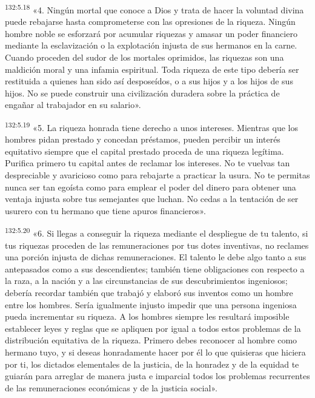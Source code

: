 \par
\textsuperscript{132:5.18} «4. Ningún mortal que conoce a Dios y trata de hacer la voluntad divina puede rebajarse hasta comprometerse con las opresiones de la riqueza. Ningún hombre noble se esforzará por acumular riquezas y amasar un poder financiero mediante la esclavización o la explotación injusta de sus hermanos en la carne. Cuando proceden del sudor de los mortales oprimidos, las riquezas son una maldición moral y una infamia espiritual. Toda riqueza de este tipo debería ser restituida a quienes han sido así desposeídos, o a sus hijos y a los hijos de sus hijos. No se puede construir una civilización duradera sobre la práctica de engañar al trabajador en su salario».

\par
\textsuperscript{132:5.19} «5. La riqueza honrada tiene derecho a unos intereses. Mientras que los hombres pidan prestado y concedan préstamos, pueden percibir un interés equitativo siempre que el capital prestado proceda de una riqueza legítima. Purifica primero tu capital antes de reclamar los intereses. No te vuelvas tan despreciable y avaricioso como para rebajarte a practicar la usura. No te permitas nunca ser tan egoísta como para emplear el poder del dinero para obtener una ventaja injusta sobre tus semejantes que luchan. No cedas a la tentación de ser usurero con tu hermano que tiene apuros financieros».

\par
\textsuperscript{132:5.20} «6. Si llegas a conseguir la riqueza mediante el despliegue de tu talento, si tus riquezas proceden de las remuneraciones por tus dotes inventivas, no reclames una porción injusta de dichas remuneraciones. El talento le debe algo tanto a sus antepasados como a sus descendientes; también tiene obligaciones con respecto a la raza, a la nación y a las circunstancias de sus descubrimientos ingeniosos; debería recordar también que trabajó y elaboró sus inventos como un hombre entre los hombres. Sería igualmente injusto impedir que una persona ingeniosa pueda incrementar su riqueza. A los hombres siempre les resultará imposible establecer leyes y reglas que se apliquen por igual a todos estos problemas de la distribución equitativa de la riqueza. Primero debes reconocer al hombre como hermano tuyo, y si deseas honradamente hacer por él lo que quisieras que hiciera por ti, los dictados elementales de la justicia, de la honradez y de la equidad te guiarán para arreglar de manera justa e imparcial todos los problemas recurrentes de las remuneraciones económicas y de la justicia social».

